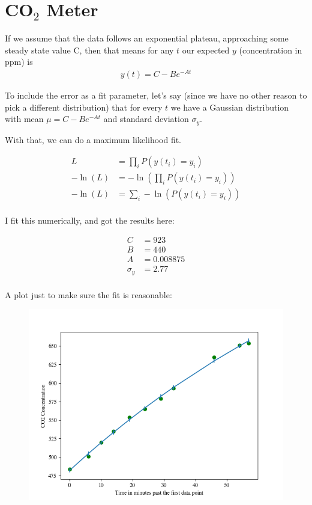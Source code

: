 \section{\texorpdfstring{CO$_2$}{CO2} Meter}

If we assume that the data follows an exponential plateau, approaching some steady state value C, then that means for any $t$ our expected $y$ (concentration in ppm) is
\begin{align*}
    y(t) = C - B e^{-At}
\end{align*}

To include the error as a fit parameter, let's say (since we have no other reason to pick a different distribution) that for every $t$ we have a Gaussian distribution with mean $\mu = C - B e^{-At}$ and standard deviation $\sigma_y$.

With that, we can do a maximum likelihood fit.

\begin{align*}
    L &= \prod_i P(y(t_i)=y_i) \\
    -\ln(L) &= -\ln(\prod_i P(y(t_i)=y_i)) \\
    -\ln(L) &= \sum_i -\ln(P(y(t_i)=y_i)) \\
\end{align*}

I fit this numerically, and got the results here:

\begin{align*}
    C &= 923 \\
    B &= 440 \\
    A &= 0.008875\\
    \sigma_y &= 2.77 \\
\end{align*}

A plot just to make sure the fit is reasonable:
\begin{figure}[H]
    \includegraphics[width=\textwidth]{q3.png}
\end{figure}

